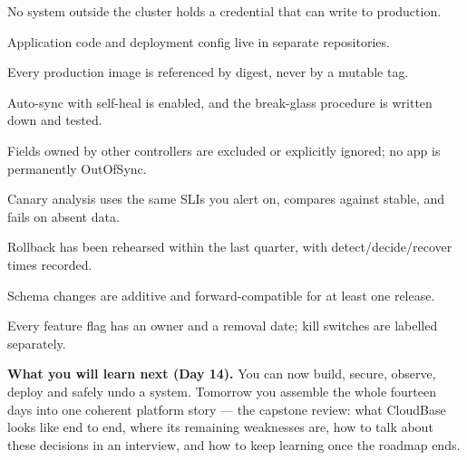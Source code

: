 \begin{checklist}
  \item No system outside the cluster holds a credential that can write to production.
  \item Application code and deployment config live in separate repositories.
  \item Every production image is referenced by digest, never by a mutable tag.
  \item Auto-sync with self-heal is enabled, and the break-glass procedure is written down and tested.
  \item Fields owned by other controllers are excluded or explicitly ignored; no app is permanently OutOfSync.
  \item Canary analysis uses the same SLIs you alert on, compares against stable, and fails on absent data.
  \item Rollback has been rehearsed within the last quarter, with detect/decide/recover times recorded.
  \item Schema changes are additive and forward-compatible for at least one release.
  \item Every feature flag has an owner and a removal date; kill switches are labelled separately.
\end{checklist}

\begin{keyidea}
\textbf{What you will learn next (Day 14).} You can now build, secure, observe, deploy and safely undo a system. Tomorrow you assemble the whole fourteen days into one coherent platform story --- the capstone review: what CloudBase looks like end to end, where its remaining weaknesses are, how to talk about these decisions in an interview, and how to keep learning once the roadmap ends.
\end{keyidea}
